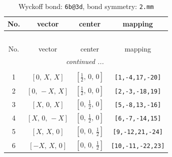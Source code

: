 \documentclass[fleqn,8pt]{jsarticle}
\begin{document}
\begin{longtable}{cccc}
\caption{Wyckoff bond: {\tt 6b@3d}, bond symmetry: {\tt 2.mm}}
 \\
 \hline \hline
No. & vector & center & mapping \\ \hline \endfirsthead

\multicolumn{3}{l}{\tablename\ \thetable{}} \\
 \hline \hline
No. & vector & center & mapping \\ \hline \endhead

 \hline \hline
\multicolumn{3}{r}{\footnotesize\it continued ...} \\ \endfoot

 \hline \hline
\multicolumn{3}{r}{} \\ \endlastfoot

1 & $\left[ 0,\, X,\, X \right]$ & $\left[ \frac{1}{2},\, 0,\, 0 \right]$ & {\tt [1,-4,17,-20]} \\ \hline
2 & $\left[ 0,\, - X,\, X \right]$ & $\left[ \frac{1}{2},\, 0,\, 0 \right]$ & {\tt [2,-3,-18,19]} \\ \hline
3 & $\left[ X,\, 0,\, X \right]$ & $\left[ 0,\, \frac{1}{2},\, 0 \right]$ & {\tt [5,-8,13,-16]} \\ \hline
4 & $\left[ X,\, 0,\, - X \right]$ & $\left[ 0,\, \frac{1}{2},\, 0 \right]$ & {\tt [6,-7,-14,15]} \\ \hline
5 & $\left[ X,\, X,\, 0 \right]$ & $\left[ 0,\, 0,\, \frac{1}{2} \right]$ & {\tt [9,-12,21,-24]} \\ \hline
6 & $\left[ - X,\, X,\, 0 \right]$ & $\left[ 0,\, 0,\, \frac{1}{2} \right]$ & {\tt [10,-11,-22,23]} \\
\end{longtable}
\renewcommand{\arraystretch}{1.2}
\end{document}
